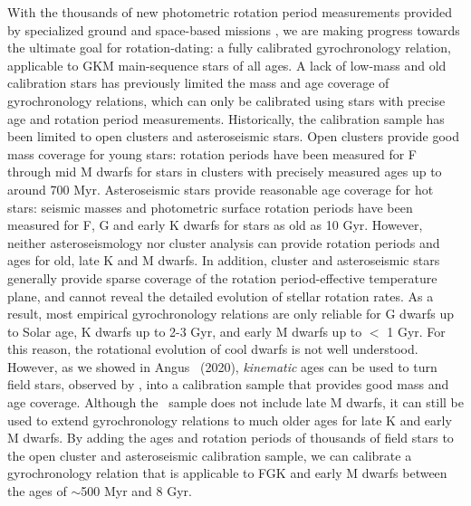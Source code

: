 With the thousands of new photometric rotation period measurements provided by
specialized ground and space-based missions \citep[particularly \kepler/\ktwo\
and \tess][]{borucki2010, howell2014, ricker2015}, we are making progress
towards the ultimate goal for rotation-dating: a fully calibrated
gyrochronology relation, applicable to GKM main-sequence stars of all ages.
A lack of low-mass and old calibration stars has previously limited the mass
and age coverage of gyrochronology relations, which can only be calibrated
using stars with precise age and rotation period measurements.
Historically, the calibration sample has been limited to open clusters and
asteroseismic stars.
Open clusters provide good mass coverage for young stars: rotation periods
have been measured for F through mid M dwarfs for stars in clusters with
precisely measured ages up to around 700 Myr.
Asteroseismic stars provide reasonable age coverage for hot stars: seismic
masses and photometric surface rotation periods have been measured for F, G
and early K dwarfs for stars as old as 10 Gyr.
However, neither asteroseismology nor cluster analysis can provide rotation
periods and ages for old, late K and M dwarfs.
In addition, cluster and asteroseismic stars generally provide sparse coverage
of the rotation period-effective temperature plane, and cannot reveal the
detailed evolution of stellar rotation rates.
As a result, most empirical gyrochronology relations are only reliable for G
dwarfs up to Solar age, K dwarfs up to 2-3 Gyr, and early M dwarfs up to $<$ 1
Gyr.
For this reason, the rotational evolution of cool dwarfs is not well
understood.
However, as we showed in Angus \etal\ (2020), {\it kinematic} ages can be used
to turn field stars, observed by \kepler, into a calibration sample that
provides good mass and age coverage.
Although the \kepler\ sample does not include late M dwarfs, it can still be
used to extend gyrochronology relations to much older ages for late K and
early M dwarfs.
By adding the ages and rotation periods of thousands of field stars to the
open cluster and asteroseismic calibration sample, we can calibrate a
gyrochronology relation that is applicable to FGK and early M dwarfs between
the ages of $\sim$500 Myr and 8 Gyr.

